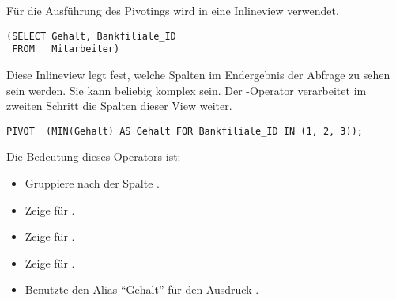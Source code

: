           Für die Ausführung des Pivotings wird in  eine Inlineview verwendet.
          \begin{lstlisting}[language=oracle_sql,caption={Die Inlineview},label=sql06_18]
(SELECT Gehalt, Bankfiliale_ID
 FROM   Mitarbeiter)
          \end{lstlisting}
          Diese Inlineview legt fest, welche Spalten im Endergebnis der Abfrage zu sehen sein werden. Sie kann beliebig komplex sein. Der -Operator verarbeitet im zweiten Schritt die Spalten dieser View weiter.
          \begin{lstlisting}[language=oracle_sql,caption={Der \languageorasql{PIVOT}-Operator},label=sql06_19]
PIVOT  (MIN(Gehalt) AS Gehalt FOR Bankfiliale_ID IN (1, 2, 3));
          \end{lstlisting}
          Die Bedeutung dieses Operators ist:
          \begin{itemize}
            \item Gruppiere nach der Spalte .
            \item Zeige  für .
            \item Zeige  für .
            \item Zeige  für .
            \item Benutzte den Alias \enquote{Gehalt} für den Ausdruck .
          \end{itemize}
